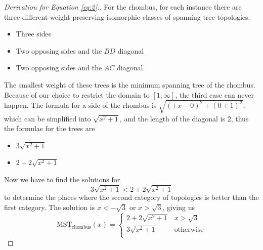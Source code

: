 \documentclass{mpaper}
\begin{document}
\begin{proof} [Derivation for Equation \ref{eq:2}:]
  For the rhombus, for each instance there are three different weight-preserving isomorphic classes of spanning tree topologies:
  \begin{itemize}
    \item Three sides
    \item Two opposing sides and the $BD$ diagonal
    \item Two opposing sides and the $AC$ diagonal
  \end{itemize}
  The smallest weight of these trees is the minimum spanning tree of the rhombus. Because of our choice to restrict the domain to $[1;\infty]$, the third case can never happen. The formula for a side of the rhombus is $\sqrt{(\pm x-0)^2+(0\mp 1)^2}$, which can be simplified into $\sqrt{x^2+1}$, and the length of the diagonal is 2, thus the formulae for the trees are
  \begin{itemize}
    \item $3\sqrt{x^2+1}$
    \item $2+2\sqrt{x^2+1}$
  \end{itemize}
  Now we have to find the solutions for $$3\sqrt{x^2+1} < 2+2\sqrt{x^2+1}$$  to determine the places where the second  category of topologies is better than the first category. The solution is $x<-\sqrt{3}$ or $x>\sqrt{3}$, giving us
\[
  \operatorname{MST_{rhombus}}(x)=  
\begin{cases} 
  2+2\sqrt{x^2+1} & x >\sqrt{3} \\
  3\sqrt{x^2+1} & \text{otherwise} \\
\end{cases}
\]
\end{proof}
\end{document}
